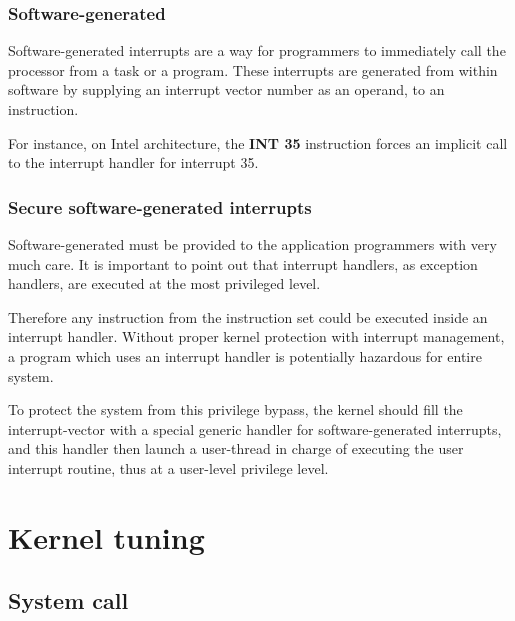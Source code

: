 
\begin{frame}
  \frametitle{Software-generated}

Software-generated interrupts are a way for programmers to immediately call the processor from a task or a program. These interrupts are generated from within software by supplying an interrupt vector number as an operand, to an instruction.

\-

For instance, on Intel architecture, the \textbf{INT 35} instruction forces an implicit call to the interrupt handler for interrupt 35.

\end{frame}


\begin{frame}
  \frametitle{Secure software-generated interrupts}

Software-generated must be provided to the application programmers with very much care. It is important to point out that interrupt handlers, as exception handlers, are executed at the most privileged level.

\-

Therefore any instruction from the instruction set could be executed inside an interrupt handler. Without proper kernel protection with interrupt management, a program which uses an interrupt handler is potentially hazardous for entire system.

\-

To protect the system from this privilege bypass, the kernel should fill the interrupt-vector with a special generic handler for software-generated interrupts, and this handler then launch a user-thread in charge of executing the user interrupt routine, thus at a user-level privilege level.

\end{frame}

%
%

\section{Kernel tuning}


\subsection{System call}


